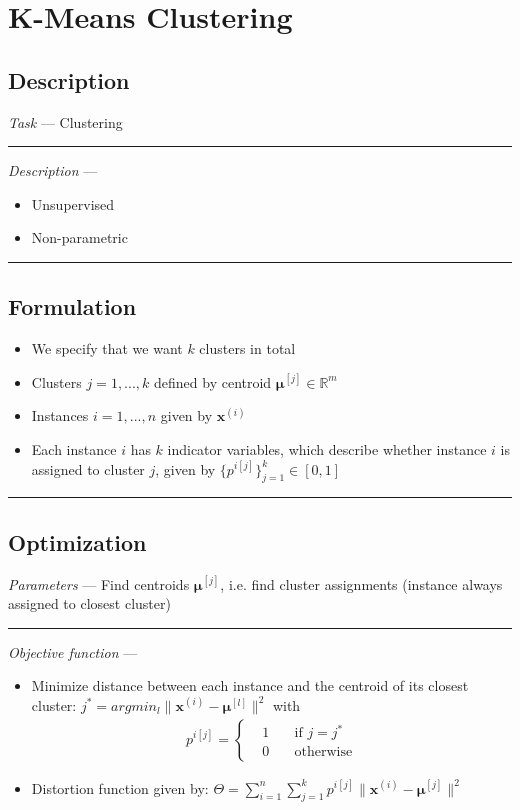 \section{K-Means Clustering}
\subsection*{Description}
\emph{Task} --- Clustering

{\color{lightgray}\hrule height 0.001mm}

\emph{Description} --- 
\begin{itemize}
    \item Unsupervised
    \item Non-parametric
\end{itemize}

{\color{black}\hrule height 0.001mm}

\subsection*{Formulation}

\begin{itemize}
    \item We specify that we want $k$ clusters in total
    \item Clusters $j= 1, ..., k$ defined by centroid $\boldsymbol{\mu}^{[j]}  \in \mathbb{R}^m$
    \item Instances $i = 1, ..., n$ given by $\boldsymbol{x}^{(i)}$
    \item Each instance $i$ has $k$ indicator variables, which describe whether instance $i$ is assigned to cluster $j$, given by $\{p^{i[j]}\}_{j=1}^k \in [0,1]$
\end{itemize}

{\color{black}\hrule height 0.001mm}

\subsection*{Optimization}
\emph{Parameters} --- Find centroids $\boldsymbol{\mu}^{[j]}$, i.e. find cluster assignments (instance always assigned to closest cluster) 

{\color{lightgray}\hrule height 0.001mm}

\emph{Objective function} --- 
\begin{itemize}
    \item Minimize distance between each instance and the centroid of its closest cluster: $j^* = argmin_l \| \boldsymbol{x}^{(i)} - \boldsymbol{\mu}^{[l]} \|^2$ with
    \begin{align*}
    p^{i[j]} = 
    \left\{
        \begin{aligned}
             & 1 \quad & \text{if } j = j^* \\
             & 0 \quad & \text{otherwise}   
        \end{aligned}
    \right.
    \end{align*}
    \item Distortion function given by: $\Theta = \sum_{i=1}^n \sum_{j=1}^k p^{i[j]} \| \boldsymbol{x}^{(i)} - \boldsymbol{\mu}^{[j]} \|^2$
\end{itemize}

